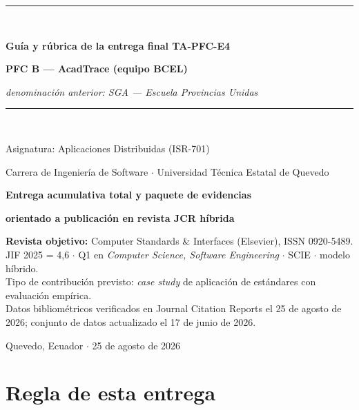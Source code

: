 \documentclass[11pt,a4paper]{article}
\begin{document}
\begin{titlepage}
	\centering
	\vspace*{1.2cm}
	{\color{azulUTEQ}\rule{\textwidth}{2pt}}\\[10pt]
	{\LARGE\bfseries\color{azulUTEQ} Guía y rúbrica de la entrega final TA-PFC-E4\par}
	\vspace{8pt}
	{\Large\bfseries\color{azulUTEQ} PFC B --- AcadTrace (equipo BCEL)\par}
	\vspace{4pt}
	{\normalsize\color{grisTexto}\emph{denominación anterior: SGA --- Escuela Provincias Unidas}\par}
	\vspace{10pt}
	{\color{azulUTEQ}\rule{\textwidth}{2pt}}\\[16pt]
	{\large Asignatura: Aplicaciones Distribuidas (ISR-701)\par}
	\vspace{4pt}
	{\large Carrera de Ingeniería de Software $\cdot$ Universidad Técnica Estatal de Quevedo\par}
	\vspace{24pt}
	{\large\bfseries Entrega acumulativa total y paquete de evidencias\par}
	{\large\bfseries orientado a publicación en revista JCR híbrida\par}
	\vspace{24pt}
	\begin{minipage}{0.86\textwidth}
		\centering
		\color{grisTexto}
		\small
		\textbf{Revista objetivo:} Computer Standards \& Interfaces (Elsevier), ISSN 0920-5489.\\
		JIF 2025 = 4,6 $\cdot$ Q1 en \emph{Computer Science, Software Engineering} $\cdot$ SCIE $\cdot$ modelo híbrido.\\[6pt]
		Tipo de contribución previsto: \emph{case study} de aplicación de estándares con evaluación empírica.\\[6pt]
		Datos bibliométricos verificados en Journal Citation Reports el 25 de agosto de 2026; conjunto de datos actualizado el 17 de junio de 2026.
	\end{minipage}
	\vfill
	{\small Quevedo, Ecuador $\cdot$ 25 de agosto de 2026\par}
\end{titlepage}

\tableofcontents
\newpage

\section{Regla de esta entrega}
\end{document}
